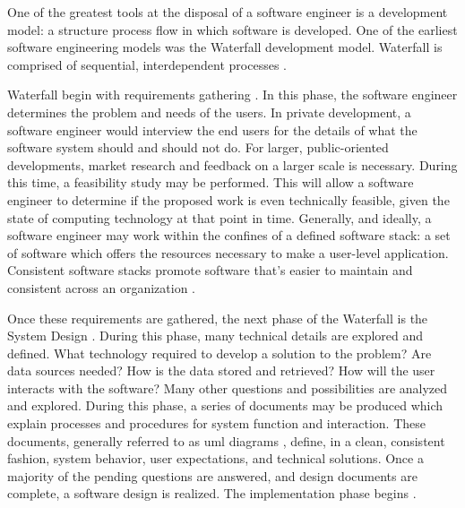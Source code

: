     \par One of the greatest tools at the disposal of a software engineer is a development model: a structure process flow in which software is developed. One of the earliest software engineering models was the Waterfall development model. Waterfall is comprised of sequential, interdependent processes \cite{Sommerville2011}.

    \par Waterfall begin with requirements gathering \cite{Sommerville2011}. In this phase, the software engineer determines the problem and needs of the users. In private development, a software engineer would interview the end users for the details of what the software system should and should not do. For larger, public-oriented developments, market research and feedback on a larger scale is necessary. During this time, a feasibility study may be performed. This will allow a software engineer to determine if the proposed work is even technically feasible, given the state of computing technology at that point in time. Generally, and ideally, a software engineer may work within the confines of a defined software stack: a set of software which offers the resources necessary to make a user-level application. Consistent software stacks promote software that's easier to maintain and consistent across an organization \cite{Sommerville2011}.

    \par Once these requirements are gathered, the next phase of the Waterfall is the System Design \cite{Sommerville2011}. During this phase, many technical details are explored and defined. What technology required to develop a solution to the problem? Are data sources needed? How is the data stored and retrieved? How will the user interacts with the software? Many other questions and possibilities are analyzed and explored. During this phase, a series of documents may be produced which explain processes and procedures for system function and interaction. These documents, generally referred to as \gls{uml} diagrams \cite{Medvidovic2002}, define, in a clean, consistent fashion, system behavior, user expectations, and technical solutions. Once a majority of the pending questions are answered, and design documents are complete, a software design is realized. The implementation phase begins \cite{Sommerville2011}.

